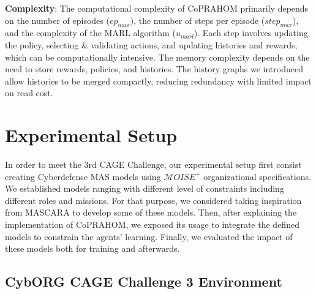 \documentclass[conference]{IEEEtran}
\begin{document}
\textbf{Complexity}: \quad The computational complexity of CoPRAHOM primarily depends on the number of episodes ($ep_{max}$), the number of steps per episode ($step_{max}$), and the complexity of the MARL algorithm ($u_{marl}$). Each step involves updating the policy, selecting \& validating actions, and updating histories and rewards, which can be computationally intensive. The memory complexity depends on the need to store rewards, policies, and histories. The history graphs we introduced allow histories to be merged compactly, reducing redundancy with limited impact on read cost.




\section{Experimental Setup}\label{sec:experimental_setup}

In order to meet the 3rd CAGE Challenge, our experimental setup first consist creating Cyberdefense MAS models using $\mathcal{M}OISE^+$ organizational specifications. We established models ranging with different level of constraints including different roles and missions. For that purpose, we considered taking inspiration from MASCARA to develop some of these models. Then, after explaining the implementation of CoPRAHOM, we exposed its usage to integrate the defined models to constrain the agents' learning. Finally, we evaluated the impact of these models both for training and afterwards.


\subsection{CybORG CAGE Challenge 3 Environment}
\end{document}
